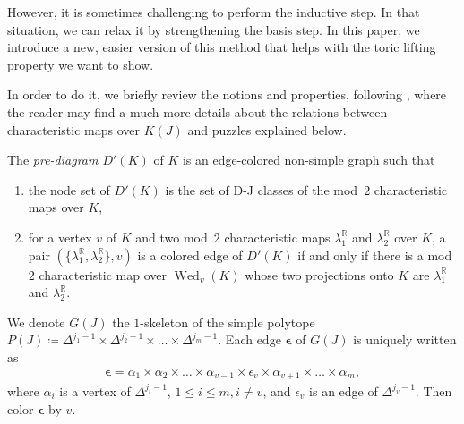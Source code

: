 \documentclass[11pt]{amsart}
\theoremstyle{plain}
\numberwithin{equation}{section}
\theoremstyle{definition}
\newcommand{\R}{\mathbb{R}}
\DeclareMathOperator{\wed}{Wed}
\begin{document}
However, it is sometimes challenging to perform the inductive step.
In that situation, we can relax it by strengthening the basis step.
In this paper, we introduce a new, easier version of this method that helps with the toric lifting property we want to show.

In order to do it, we briefly review the notions and properties, following \cite{CP_wedge_2}, where the reader may find a much more details about the relations between characteristic maps over $K(J)$ and puzzles explained below.


The \emph{pre-diagram $D'(K)$} of $K$ is an edge-colored non-simple graph such that
\begin{enumerate}
    \item the node set of $D'(K)$ is the set of D-J classes of the mod~$2$ characteristic maps over $K$,
    \item for a vertex $v$ of $K$ and two mod~$2$ characteristic maps $\lambda^\R_1$ and $\lambda^\R_2$ over $K$, a pair $(\{\lambda^\R_1, \lambda^\R_2\}, v)$ is a colored edge of $D'(K)$ if and only if there is a mod~$2$ characteristic map over $\wed_{v}(K)$ whose two projections onto $K$ are $\lambda^\R_1$ and $\lambda^\R_2$.
\end{enumerate}

We denote $G(J)$ the $1$-skeleton of the simple polytope $P(J) \coloneqq \Delta^{j_1-1} \times \Delta^{j_2-1} \times \dots \times \Delta^{j_m-1}$.
Each edge $\bm{\epsilon}$ of $G(J)$ is uniquely written as 
\begin{align*}
    \bm{\epsilon} = \alpha_1 \times \alpha_2 \times \dots \times \alpha_{v-1} \times \epsilon_v \times \alpha_{v+1} \times \dots \times \alpha_m,
\end{align*}
where $\alpha_i$ is a vertex of $\Delta^{j_i-1}$, $1 \leq i \leq m, i \not= v$, and $\epsilon_v$ is an edge of $\Delta^{j_v-1}$.
Then color $\bm{\epsilon}$ by $v$.
\end{document}
